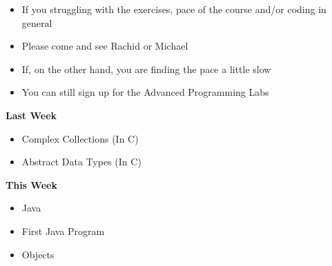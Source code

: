 \documentclass{beamer}
\begin{document}
\begin{frame}
\begin{itemize}
\item If you struggling with the exercises, pace of the course and/or coding in general
\item Please come and see Rachid or Michael
\end{itemize}
\end{frame}
 
\begin{frame} 
\begin{itemize}
\item If, on the other hand, you are finding the pace a little slow  
\item You can still sign up for the Advanced Programming Labs
\end{itemize}
\end{frame}

\begin{frame}
\begin{center}
\textbf{Last Week}
\end{center}
\begin{itemize}
\item Complex Collections (In C)
\item Abstract Data Types (In C)
\end{itemize}
\end{frame}

\begin{frame}
\begin{center}
\textbf{This Week}
\end{center}
\begin{itemize}
\item Java
\item First Java Program
\item Objects
\end{itemize}
\end{frame}
\end{document}
